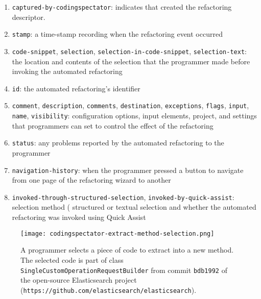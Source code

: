 \begin{enumerate}

\item \texttt{captured-by-codingspectator}: indicates that \CodingSpectator{}
  created the refactoring descriptor.

\item \texttt{stamp}: a time-stamp recording when the refactoring event occurred

\item \texttt{code-snippet}, \texttt{selection},
  \texttt{selection-in-code-snippet}, \texttt{selection-text}: the location and
  contents of the selection that the programmer made before invoking the
  automated refactoring

\item \texttt{id}: the automated refactoring's identifier

\item \texttt{comment}, \texttt{description}, \texttt{comments},
  \texttt{destination}, \texttt{exceptions}, \texttt{flags}, \texttt{input},
  \texttt{name}, \texttt{visibility}: configuration options, \eg{} input
  elements, project, and settings that programmers can set to control the effect
  of the refactoring

\item \texttt{status}: any problems reported by the automated refactoring to the
  programmer

\item \texttt{navigation-history}: when the programmer pressed a button to
  navigate from one page of the refactoring wizard to another

\item \texttt{invoked-through-structured-selection},
  \texttt{invoked-by-quick-assist}: selection method (\eg{} structured or
  textual selection and whether the automated refactoring was invoked using
  Quick Assist

\end{enumerate}

\begin{figure}
%
\centering
%
\texttt{[image: codingspectator-extract-method-selection.png]}
%
\caption{\label{FigCodingSpectatorExtractMethodSelectionExample}A programmer
selects a piece of code to extract into a new method. The selected code is part
of class \texttt{SingleCustomOperationRequestBuilder} from commit
\texttt{bdb1992} of the open-source Elasticsearch project
(\texttt{https://github.com/elasticsearch/elasticsearch}).}
%
\end{figure}

